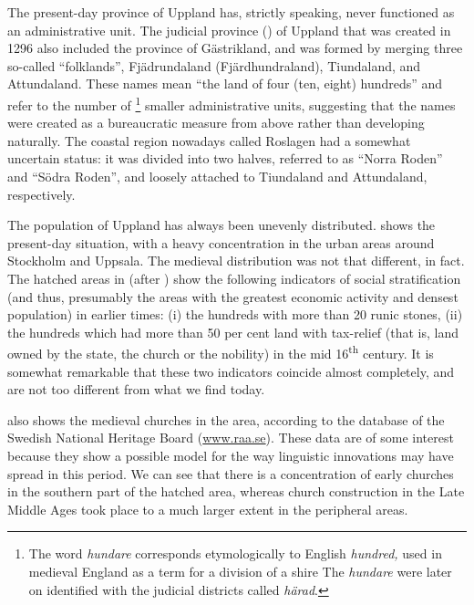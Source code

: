 The present-day province of Uppland has, strictly speaking, never functioned as an administrative unit. The judicial province () of Uppland that was created in 1296 also included the province of Gästrikland, and was formed by merging three so-called “folklands”, Fjädrundaland (Fjärdhundraland), Tiundaland, and Attundaland. These names mean “the land of four (ten, eight) hundreds” and refer to the number of \textstyleLinguisticExample{,}\footnote{ The word \textit{hundare} corresponds etymologically to English \textit{hundred}\textit{,} used in medieval England as a term for a division of a shire The \textit{hundare} were later on identified with the judicial districts called \textit{härad}.} smaller administrative units, suggesting that the names were created as a bureaucratic measure from above rather than developing naturally. The coastal region nowadays called Roslagen had a somewhat uncertain status: it was divided into two halves, referred to as “Norra Roden” and “Södra Roden”, and loosely attached to Tiundaland and Attundaland, respectively. 

The population of Uppland has always been unevenly distributed.  shows the present-day situation, with a heavy concentration in the urban areas around Stockholm and Uppsala. The medieval distribution was not that different, in fact. The hatched areas in  (after \citealt{Broberg1990}) show the following indicators of social stratification (and thus, presumably the areas with the greatest economic activity and densest population) in earlier times: (i) the hundreds with more than 20 runic stones, (ii) the hundreds which had more than 50 per cent land with tax-relief (that is, land owned by the state, the church or the nobility) in the mid 16\textsuperscript{th} century. It is somewhat remarkable that these two indicators coincide almost completely, and are not too different from what we find today. 

 also shows the medieval churches in the area, according to the database of the Swedish National Heritage Board (\href{http://www.raa.se}{{www.raa.se}}). These data are of some interest because they show a possible model for the way linguistic innovations may have spread in this period. We can see that there is a concentration of early churches in the southern part of the hatched area, whereas church construction in the Late Middle Ages took place to a much larger extent in the peripheral areas.

